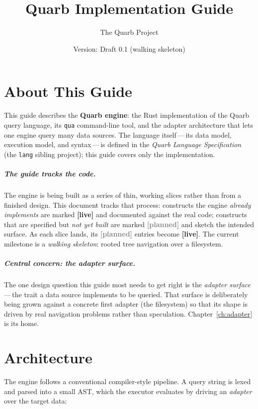 \documentclass{report}
\title{Quarb Implementation Guide}
\author{The Quarb Project}
\date{Version: Draft 0.1 (walking skeleton)}
\newcommand{\live}{\textbf{\textcolor{blue!60!black}{[live]}}\xspace}
\newcommand{\planned}{\textbf{\textcolor{gray}{[planned]}}\xspace}
\begin{document}
\maketitle
\tableofcontents

\chapter{About This Guide}

This guide describes the \textbf{Quarb engine}: the Rust
implementation of the Quarb query language, its \texttt{qua}
command-line tool, and the adapter architecture that lets one engine
query many data sources. The language itself\,---\,its data model,
execution model, and syntax\,---\,is defined in the \emph{Quarb
Language Specification} (the \texttt{lang} sibling project); this
guide covers only the implementation.

\paragraph{The guide tracks the code.}
The engine is being built as a series of thin, working slices rather
than from a finished design. This document tracks that process:
constructs the engine \emph{already implements} are marked \live and
documented against the real code; constructs that are specified but
\emph{not yet built} are marked \planned and sketch the intended
surface. As each slice lands, its \planned entries become \live. The
current milestone is a \emph{walking skeleton}: rooted tree
navigation over a filesystem.

\paragraph{Central concern: the adapter surface.}
The one design question this guide most needs to get right is the
\emph{adapter surface}\,---\,the trait a data source implements to be
queried. That surface is deliberately being grown against a concrete
first adapter (the filesystem) so that its shape is driven by real
navigation problems rather than speculation. Chapter~\ref{ch:adapter}
is its home.


\chapter{Architecture}

The engine follows a conventional compiler-style pipeline. A query
string is lexed and parsed into a small AST, which the executor
evaluates by driving an \emph{adapter} over the target data:
\end{document}
